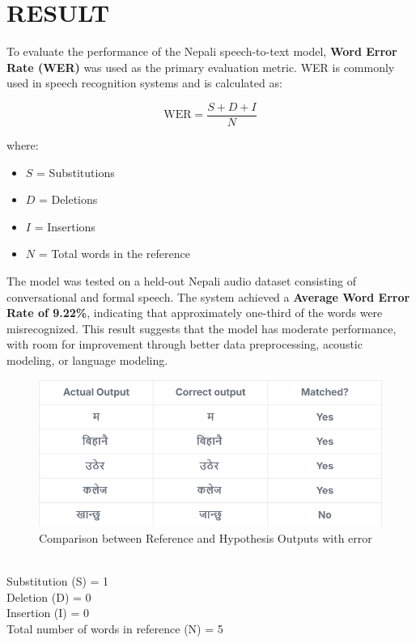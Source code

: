 \chapter{RESULT}

To evaluate the performance of the Nepali speech-to-text model, \textbf{Word Error Rate (WER)} was used as the primary evaluation metric. WER is commonly used in speech recognition systems and is calculated as:

\begin{equation}
\text{WER} = \frac{S + D + I}{N}
\end{equation}

where:
\begin{itemize}
    \item $S$ = Substitutions
    \item $D$ = Deletions
    \item $I$ = Insertions
    \item $N$ = Total words in the reference
\end{itemize}

The model was tested on a held-out Nepali audio dataset consisting of conversational and formal speech. The system achieved a \textbf{Average Word Error Rate of 9.22\%}, indicating that approximately one-third of the words were misrecognized. This result suggests that the model has moderate performance, with room for improvement through better data preprocessing, acoustic modeling, or language modeling.



\begin{figure}[H]  %
    \centering
    \includegraphics[width=\textwidth]{Images/eg1.png}
    \caption{Comparison between Reference and Hypothesis Outputs with error }
    \label{fig:ref_vs_hyp}
\end{figure}
\text{}\\
Substitution (S) = 1 \\
Deletion (D) = 0 \\
Insertion (I) = 0 \\
Total number of words in reference (N) = 5 \\



